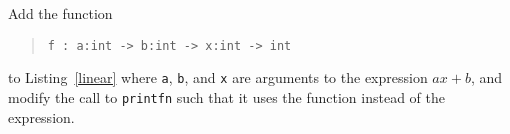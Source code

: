 \label{linearFct}
Add the function
  \begin{quote}
    \mbox{\lstinline!f : a:int -> b:int -> x:int -> int!}
  \end{quote}
to Listing~\ref{linear} where \lstinline!a!, \lstinline!b!, and
\lstinline!x! are arguments to the expression $ax+b$, and modify the
call to \lstinline!printfn! such that it uses the function instead of
the expression.
